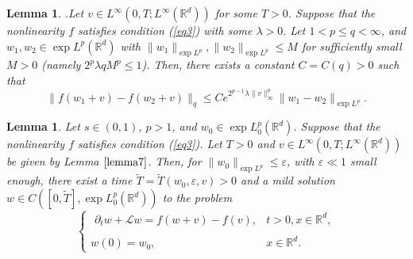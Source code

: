 \documentclass[a4paper,11pt]{amsart}
\numberwithin{equation}{section}
\theoremstyle{plain}
\newtheorem{lemma}[theorem]{Lemma}
\theoremstyle{definition}
\begin{document}
\begin{lemma}\cite[Lemma 4.4]{Majdoub2}.\label{lemma9}
Let $v\in L^\infty(0,T;L^\infty(\mathbb{R}^d))$ for some $T>0$. Suppose that the nonlinearity $f$ satisfies condition \emph{(\ref{eq3})} with some $\lambda>0.$ Let $1<p\leq q<\infty$, and $w_1,w_2\in \exp L^p(\mathbb{R}^d)$ with $\|w_1\|_{\exp L^p},\|w_2\|_{\exp L^p}\leq M$ for sufficiently small $M>0$ (namely $2^p\lambda q M^p\leq1$). Then, there exists a constant $C=C(q)>0$ such that 
$$\|f(w_1+v)-f(w_2+v)\|_q\leq Ce^{2^{p-1}\lambda\|v\|_\infty^p}\|w_1-w_2\|_{\exp L^p}.$$
 \end{lemma}

\begin{lemma}${}$\label{lemma8}
Let $s\in(0,1)$, $p>1$, and $w_0\in \exp L^p_0(\mathbb{R}^d)$. Suppose that the nonlinearity $f$ satisfies condition \emph{(\ref{eq3})}. Let $T>0$ and $v\in L^\infty(0,T;L^\infty(\mathbb{R}^d))$ be given by Lemma $\ref{lemma7}$. Then, for $\|w_0\|_{\exp L^p}\leq\varepsilon$, with $\varepsilon\ll1$ small enough, there exist a time $\widetilde{T}=\widetilde{T}(w_0,\varepsilon, v)>0$ and a mild solution $w\in C([0,\widetilde{T}],\exp L^p_0(\mathbb{R}^d))$ to the problem 
\begin{equation}\label{eq25}
\left\{\begin{array}{ll}
\,\, \displaystyle {\partial_t w+\mathcal{L}w =f(w+v)-f(v),} &\displaystyle {t>0,x\in {\mathbb{R}^d},}\\
{}\\
w(0)= w_0, & \displaystyle{ x\in {\mathbb{R}^d}.}
\end{array}
\right.
\end{equation} 
 \end{lemma}
\end{document}
